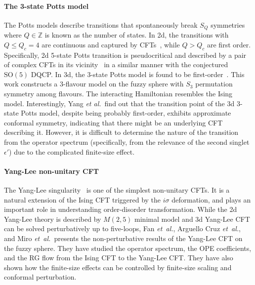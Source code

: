 \documentclass{timesjhep}
\begin{document}
\paragraph{The 3-state Potts model~\cite{Yang2025}}

The Potts models describe transitions that spontaneously break $S_Q$ symmetries where $Q\in\mathbb{Z}$ is known as the number of states. In 2d, the transitions with $Q\leq Q_c=4$ are continuous and captured by CFTs~\cite{Dotsenko1984Potts}, while $Q>Q_c$ are first order. Specifically, 2d 5-state Potts transition is pseudocritical and described by a pair of complex CFTs in its vicinity~\cite{Tang2024Potts} in a similar manner with the conjectured $\mathrm{SO}(5)$ DQCP. In 3d, the 3-state Potts model is found to be first-order~\cite{Barkema1991Potts,Chester2022Potts}. This work constructs a 3-flavour model on the fuzzy sphere with $S_3$ permutation symmetry among flavours. The interacting Hamiltonian resembles the Ising model. Interestingly, Yang \textit{et al.}~find out that the transition point of the 3d 3-state Potts model, despite being probably first-order, exhibits approximate conformal symmetry, indicating that there might be an underlying CFT describing it. However, it is difficult to determine the nature of the transition from the operator spectrum (specifically, from the relevance of the second singlet $\epsilon'$) due to the complicated finite-size effect.

\paragraph{Yang-Lee non-unitary CFT~\cite{Fan2025,ArguelloCruz2025,Miro2025}} 

The Yang-Lee singularity~\cite{Yang1952Singularity,Lee1952Singularity,Cardy2023Singularity} is one of the simplest non-unitary CFTs. It is a natural extension of the Ising CFT triggered by the $i\sigma$ deformation, and plays an important role in understanding order-disorder transformation. While the 2d Yang-Lee theory is described by $M(2,5)$ minimal model and 3d Yang-Lee CFT can be solved perturbatively up to five-loops, Fan \textit{et~al.}, Arguello Cruz \textit{et~al.}, and Miro \textit{et~al.}~presents the non-perturbative results of the Yang-Lee CFT on the fuzzy sphere. They have studied the operator spectrum, the OPE coefficients, and the RG flow from the Ising CFT to the Yang-Lee CFT. They have also shown how the finite-size effects can be controlled by finite-size scaling and conformal perturbation.
\end{document}
